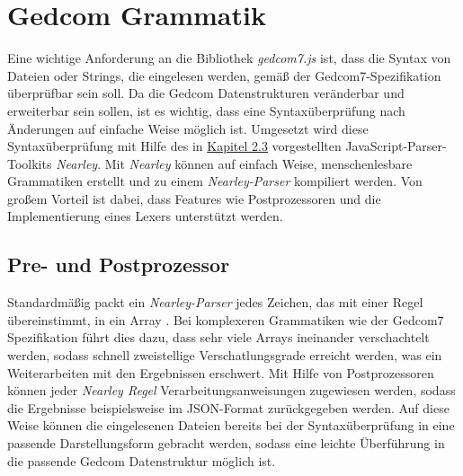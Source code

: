 \section{Gedcom Grammatik}
\label{sec: Konzept - Gedcom Grammatik}
Eine wichtige Anforderung an die Bibliothek \textit{gedcom7.js} ist, dass die Syntax von Dateien oder Strings, die eingelesen werden, gemäß der Gedcom7-Spezifikation überprüfbar sein soll. Da die Gedcom Datenstrukturen veränderbar und erweiterbar sein sollen, ist es wichtig, dass eine Syntaxüberprüfung nach Änderungen auf einfache Weise möglich ist. Umgesetzt wird diese Syntaxüberprüfung mit Hilfe des in \hyperref[sec: Nearley]{Kapitel 2.3} vorgestellten JavaScript-Parser-Toolkits \textit{Nearley}. Mit \textit{Nearley} können auf einfach Weise, menschenlesbare Grammatiken erstellt und zu einem \textit{Nearley-Parser} kompiliert werden. Von großem Vorteil ist dabei, dass Features wie Postprozessoren und die Implementierung eines Lexers unterstützt werden. 

\subsection{Pre- und Postprozessor}
\label{subsec: Konzept - Gedcom Grammatik - Pre- und Postprozessor}
Standardmäßig packt ein \textit{Nearley-Parser} jedes Zeichen, das mit einer Regel übereinstimmt, in ein Array \cite{NearleyDoc}. Bei komplexeren Grammatiken wie der Gedcom7 Spezifikation führt dies dazu, dass sehr viele Arrays ineinander verschachtelt werden, sodass schnell zweistellige Verschatlungsgrade erreicht werden, was ein Weiterarbeiten mit den Ergebnissen erschwert. Mit Hilfe von Postprozessoren können jeder \textit{Nearley Regel} Verarbeitungsanweisungen zugewiesen werden, sodass die Ergebnisse beispielsweise im JSON-Format zurückgegeben werden. Auf diese Weise können die eingelesenen Dateien bereits bei der Syntaxüberprüfung in eine passende Darstellungsform gebracht werden, sodass eine leichte Überführung in die passende Gedcom Datenstruktur möglich ist.

